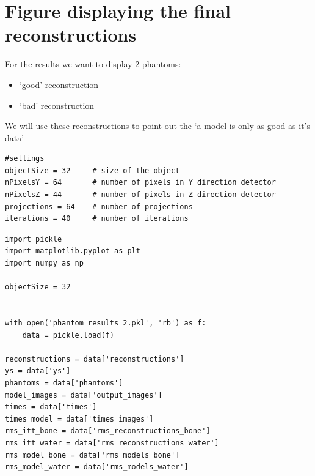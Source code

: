 \section{Figure displaying the final reconstructions}

For the results we want to display 2 phantoms:

\begin{itemize}
\item `good' reconstruction
\item `bad' reconstruction
\end{itemize}

We will use these reconstructions to point out the `a model is only as good as it's data'

\begin{verbatim}
#settings
objectSize = 32     # size of the object
nPixelsY = 64       # number of pixels in Y direction detector
nPixelsZ = 44       # number of pixels in Z direction detector
projections = 64    # number of projections
iterations = 40     # number of iterations
\end{verbatim}

\begin{verbatim}
import pickle 
import matplotlib.pyplot as plt
import numpy as np

objectSize = 32


with open('phantom_results_2.pkl', 'rb') as f:
    data = pickle.load(f)

reconstructions = data['reconstructions']
ys = data['ys']
phantoms = data['phantoms']
model_images = data['output_images']
times = data['times']
times_model = data['times_images']
rms_itt_bone = data['rms_reconstructions_bone']
rms_itt_water = data['rms_reconstructions_water']
rms_model_bone = data['rms_models_bone']
rms_model_water = data['rms_models_water']
\end{verbatim}

